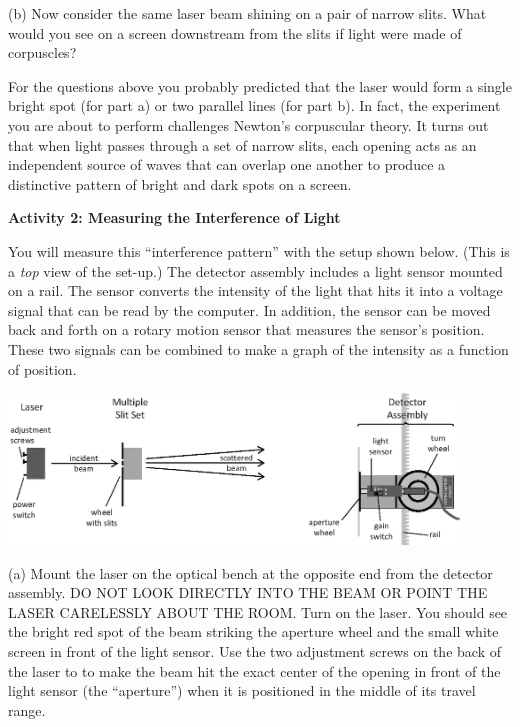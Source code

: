 (b) Now consider the same laser beam shining on a pair of narrow slits.
What would you see on a screen downstream from the slits if light
were made of corpuscles?
\answerspace{35mm}

\pagebreak[2]
For the questions above you probably predicted that the laser would
form a single bright spot (for part a) or two parallel lines (for part
b).  In fact, the experiment you are about to perform challenges Newton's corpuscular theory. 
It turns out that when light passes through a set of narrow slits, each opening acts as an independent
source of waves that can overlap one another to produce a distinctive
pattern of bright and dark spots on a screen. 

\bigskip

\textbf{Activity 2: Measuring the Interference of Light }

You will measure this ``interference pattern'' with the setup shown below. 
(This is a \textit{top} view of the set-up.) 
The detector assembly includes a light sensor mounted on a rail. The sensor converts the intensity 
of the light that hits it into a voltage signal that can be read by the
computer. In addition, the sensor can be moved back and
forth on a rotary motion sensor that measures the sensor's position. These two signals can be combined to
make a graph of the intensity as a function of position.

\answerspace{0.3cm}
\begin{center}
\includegraphics[width=0.90\textwidth]{interference_of_light/apparatus.eps}
\end{center}
\answerspace{0.3cm}

(a) Mount the laser on the 
optical bench at the opposite end from the detector assembly.
DO NOT LOOK DIRECTLY INTO
THE BEAM OR POINT THE LASER CARELESSLY ABOUT THE ROOM.  Turn on the
laser.  You should see the bright red spot of the beam striking
the aperture wheel and the small white screen in front of the light sensor. 
Use the two adjustment screws on the back of the laser to to make the beam hit the exact center of the opening in front of the light sensor (the ``aperture'') when it is positioned in the middle of its travel range.  

